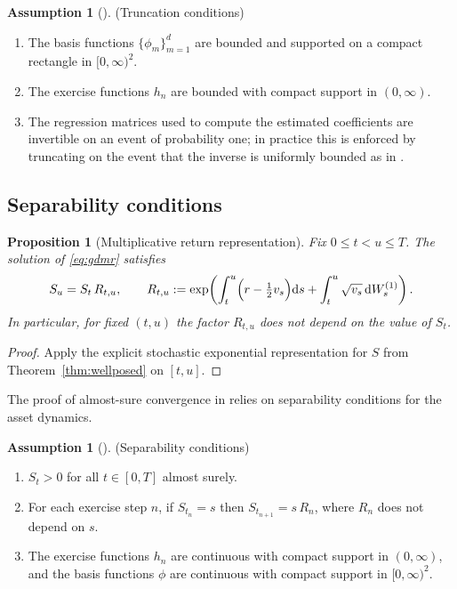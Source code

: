 \documentclass[10pt]{article}
\theoremstyle{plain}
\newtheorem{proposition}[theorem]{Proposition}
\theoremstyle{definition}
\newtheorem{assumption}[theorem]{Assumption}
\theoremstyle{remark}
\newcommand{\dd}{\mathrm d}
\begin{document}
\begin{assumption}[]\label{ass:truncation} (Truncation conditions)

\begin{enumerate}
\item The basis functions $\{\phi_m\}_{m=1}^d$ are bounded and supported on a compact rectangle in $[0,\infty)^2$.
\item The exercise functions $h_n$ are bounded with compact support in $(0,\infty)$.
\item The regression matrices used to compute the estimated coefficients are invertible on an event of probability one;
in practice this is enforced by truncating on the event that the inverse is uniformly bounded as in
\citet[Assumption~1]{farahany2020mixing}.
\end{enumerate}
\end{assumption}

\subsection{Separability conditions}

\begin{proposition}[Multiplicative return representation]\label{prop:multiplicative}
Fix $0\le t<u\le T$. The solution of \eqref{eq:gdmr} satisfies
\[
S_u=S_t\,R_{t,u},
\qquad
R_{t,u}:=\exp\!\left(\int_t^u\Bigl(r-\tfrac12 v_s\Bigr)\dd s+\int_t^u\sqrt{v_s}\,\dd W^{(1)}_s\right).
\]
In particular, for fixed $(t,u)$ the factor $R_{t,u}$ does not depend on the value of $S_t$.
\end{proposition}

\begin{proof}
Apply the explicit stochastic exponential representation for $S$ from Theorem~\ref{thm:wellposed} on $[t,u]$.
\end{proof}

The proof of almost-sure convergence in \citet{farahany2020mixing} relies on separability conditions for the asset
dynamics.

\begin{assumption}[]\label{ass:separability} (Separability conditions)
\begin{enumerate}
\item $S_t>0$ for all $t\in[0,T]$ almost surely.
\item For each exercise step $n$, if $S_{t_n}=s$ then $S_{t_{n+1}}=s\,R_n$, where $R_n$ does not depend on $s$.
\item The exercise functions $h_n$ are continuous with compact support in $(0,\infty)$, and the basis functions $\phi$
are continuous with compact support in $[0,\infty)^2$.
\end{enumerate}
\end{assumption}
\end{document}
